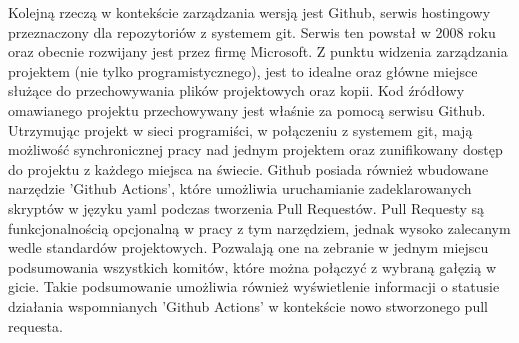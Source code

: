 Kolejną rzeczą w kontekście zarządzania wersją jest Github, serwis hostingowy przeznaczony dla repozytoriów z systemem git. Serwis ten powstał w 2008 roku oraz obecnie rozwijany jest przez firmę Microsoft.\cite{GithubWiki} Z punktu widzenia zarządzania projektem (nie tylko programistycznego), jest to idealne oraz główne miejsce służące do przechowywania plików projektowych oraz kopii. Kod źródłowy omawianego projektu przechowywany jest właśnie za pomocą serwisu Github. Utrzymując projekt w sieci programiści, w połączeniu z systemem git, mają możliwość synchronicznej pracy nad jednym projektem oraz zunifikowany dostęp do projektu z każdego miejsca na świecie. Github posiada również wbudowane narzędzie 'Github Actions', które umożliwia uruchamianie zadeklarowanych skryptów w języku yaml podczas tworzenia Pull Requestów. Pull Requesty są funkcjonalnością opcjonalną w pracy z tym narzędziem, jednak wysoko zalecanym wedle standardów projektowych. Pozwalają one na zebranie w jednym miejscu podsumowania wszystkich komitów, które można połączyć z wybraną gałęzią w gicie. Takie podsumowanie umożliwia również wyświetlenie informacji o statusie działania wspomnianych 'Github Actions' w kontekście nowo stworzonego pull requesta.